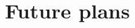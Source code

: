 \documentclass[10pt,final,a4paper,oneside,onecolumn]{article}
\begin{document}
\begin{itemize}
\end{itemize}

\section{Future plans}
\end{document}
